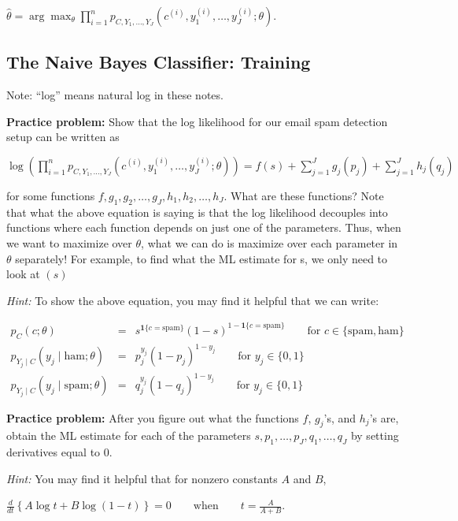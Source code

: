 {\centering$\widehat{\theta } = \arg \max _\theta \prod _{i=1}^ n p_{C, Y_1, \dots , Y_ J}(c^{(i)}, y_1^{(i)}, \dots , y_ J^{(i)}; \theta ).$ \par}


\subsection{The Naive Bayes Classifier: Training}

Note: ``log'' means natural log in these notes.

\textbf{Practice problem:} Show that the log likelihood for our email spam detection setup can be written as

{\centering$\log \left(\prod _{i=1}^{n}p_{C,Y_{1},\dots ,Y_{J}}(c^{(i)},y_{1}^{(i)},\dots ,y_{J}^{(i)};\theta )\right)=f(s)+\sum _{j=1}^{J}g_{j}(p_{j})+\sum _{j=1}^{J}h_{j}(q_{j})$ \par}
 
for some functions $f,g_{1},g_{2},\dots ,g_{J},h_{1},h_{2},\dots ,h_{J}$. What are these functions? Note that what the above equation is saying is that the log likelihood decouples into functions where each function depends on just one of the parameters. Thus, when we want to maximize over $\theta$, what we can do is maximize over each parameter in $\theta$ separately! For example, to find what the ML estimate for $ $s, we only need to look at $(s)$

\textit{Hint:} To show the above equation, you may find it helpful that we can write:

\begin{eqnarray*}
p_C(c; \theta)
&=& s^{\mathbf{1}\{c = \text{spam}\}} (1-s)^{1 - \mathbf{1}\{c = \text{spam}\}}
\qquad\text{for }c\in\{\text{spam}, \text{ham}\} \\
p_{Y_j \mid C}(y_j \mid \text{ham}; \theta)
&=& p_j^{y_j} (1-p_j)^{1 - y_j}
\qquad\text{for }y_j\in\{0, 1\} \\
p_{Y_j \mid C}(y_j \mid \text{spam}; \theta)
&=& q_j^{y_j} (1-q_j)^{1 - y_j}
\qquad\text{for }y_j\in\{0, 1\}
\end{eqnarray*}

\textbf{Practice problem:} After you figure out what the functions $f$, $g_j$'s, and $h_j$'s are, obtain the ML estimate for each of the parameters $s,p_1,\dots ,p_ J,q_1,\dots ,q_ J$ by setting derivatives equal to 0.

\textit{Hint:} You may find it helpful that for nonzero constants $A$ and $B$,

{\centering$\frac{d}{dt}\left\{  A\log t+B\log (1-t)\right\}  =0\qquad \text {when}\qquad t=\frac{A}{A+B}.$ \par} 

